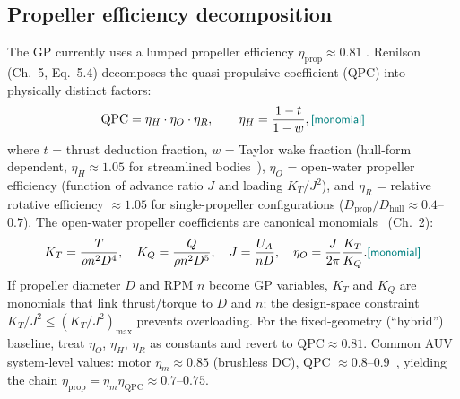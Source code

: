 \documentclass[conf]{new-aiaa}
\newcommand{\gpc}[1]{\textcolor{teal}{\small\textsf{[#1]}}} %
\begin{document}
\subsection{Propeller efficiency decomposition}\label{sec:propeller}
The GP currently uses a lumped propeller efficiency $\eta_{\text{prop}}\approx0.81$
\cite{allen2000propulsion}. Renilson~\cite{renilson2018submarine} (Ch.~5, Eq.~5.4) decomposes the
quasi-propulsive coefficient (QPC) into physically distinct factors:
\begin{equation}
\text{QPC} = \eta_H \cdot \eta_O \cdot \eta_R,
\qquad \eta_H = \frac{1-t}{1-w}, \gpc{monomial}
\end{equation}
where $t$ = thrust deduction fraction, $w$ = Taylor wake fraction (hull-form dependent,
$\eta_H\approx1.05$ for streamlined bodies~\cite{renilson2018submarine}), $\eta_O$ = open-water
propeller efficiency (function of advance ratio $J$ and loading $K_T/J^2$), and $\eta_R$ = relative
rotative efficiency $\approx1.05$ for single-propeller configurations
($D_{\text{prop}}/D_{\text{hull}}\approx0.4$--$0.7$). The open-water propeller coefficients are
canonical monomials~\cite{newman2018marine} (Ch.~2):
\begin{equation}
K_T = \frac{T}{\rho n^2 D^4},\quad
K_Q = \frac{Q}{\rho n^2 D^5},\quad
J   = \frac{U_A}{n D},\quad
\eta_O = \frac{J}{2\pi}\frac{K_T}{K_Q}. \gpc{monomial}
\end{equation}
If propeller diameter $D$ and RPM $n$ become GP variables, $K_T$ and $K_Q$ are monomials that link
thrust/torque to $D$ and $n$; the design-space constraint $K_T/J^2 \le (K_T/J^2)_{\max}$ prevents
overloading. For the fixed-geometry (``hybrid'') baseline, treat $\eta_O$, $\eta_H$, $\eta_R$ as
constants and revert to $\text{QPC}\approx0.81$. Common AUV system-level values:
motor $\eta_m\approx0.85$ (brushless DC), QPC $\approx0.8$--$0.9$~\cite{renilson2018submarine},
yielding the chain $\eta_{\text{prop}} = \eta_m\eta_{\text{QPC}} \approx 0.7$--$0.75$.
\end{document}
